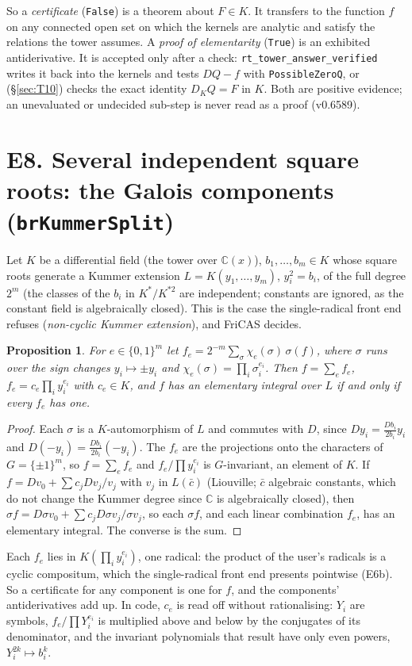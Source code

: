 \documentclass[11pt]{article}
\newtheorem{proposition}[theorem]{Proposition}
\theoremstyle{definition}
\theoremstyle{remark}
\newcommand{\C}{\mathbb{C}}
\newcommand{\code}[1]{\texttt{#1}}
\begin{document}
So a \emph{certificate} (\code{False}) is a theorem about $F\in K$. It transfers to the
function $f$ on any connected open set on which the kernels are analytic and satisfy
the relations the tower assumes. A \emph{proof of elementarity} (\code{True}) is an
exhibited antiderivative. It is accepted only after a check: \code{rt\_tower\_answer\_verified}
writes it back into the kernels and tests $D Q-f$ with \code{PossibleZeroQ}, or
(\S\ref{sec:T10}) checks the exact identity $D_K Q=F$ in $K$. Both are positive
evidence; an unevaluated or undecided sub-step is never read as a proof (v0.6589).

\section*{E8. Several independent square roots: the Galois components (\code{brKummerSplit})}
\label{sec:E8}

Let $K$ be a differential field (the tower over $\C(x)$), $b_1,\dots,b_m\in K$ whose
square roots generate a Kummer extension $L=K(y_1,\dots,y_m)$, $y_i^2=b_i$, of the full
degree $2^m$ (the classes of the $b_i$ in $K^*/K^{*2}$ are independent; constants are
ignored, as the constant field is algebraically closed). This is the case the single-radical
front end refuses (\emph{non-cyclic Kummer extension}), and FriCAS decides.

\begin{proposition}\label{prop:E8}
For $e\in\{0,1\}^m$ let $f_e=2^{-m}\sum_{\sigma}\chi_e(\sigma)\,\sigma(f)$, where $\sigma$
runs over the sign changes $y_i\mapsto\pm y_i$ and $\chi_e(\sigma)=\prod_i\sigma_i^{e_i}$.
Then $f=\sum_e f_e$, $f_e=c_e\prod_i y_i^{e_i}$ with $c_e\in K$, and $f$ has an elementary
integral over $L$ if and only if every $f_e$ has one.
\end{proposition}
\begin{proof}
Each $\sigma$ is a $K$-automorphism of $L$ and commutes with $D$, since
$Dy_i=\frac{Db_i}{2b_i}y_i$ and $D(-y_i)=\frac{Db_i}{2b_i}(-y_i)$. The $f_e$ are the
projections onto the characters of $G=\{\pm1\}^m$, so $f=\sum_e f_e$ and
$f_e/\prod y_i^{e_i}$ is $G$-invariant, an element of $K$. If $f=Dv_0+\sum c_jDv_j/v_j$
with $v_j$ in $L(\bar c)$ (Liouville; $\bar c$ algebraic constants, which do not change the
Kummer degree since $\C$ is algebraically closed), then
$\sigma f=D\sigma v_0+\sum c_jD\sigma v_j/\sigma v_j$, so each $\sigma f$, and each linear
combination $f_e$, has an elementary integral. The converse is the sum.
\end{proof}
\noindent Each $f_e$ lies in $K(\prod_i y_i^{e_i})$, one radical: the product of the user's
radicals is a cyclic compositum, which the single-radical front end presents pointwise
(E6b). So a certificate for any component is one for $f$, and the components' antiderivatives
add up. In code, $c_e$ is read off without rationalising: $Y_i$ are symbols,
$f_e/\prod Y_i^{e_i}$ is multiplied above and below by the conjugates of its denominator,
and the invariant polynomials that result have only even powers, $Y_i^{2k}\mapsto b_i^k$.
\end{document}
